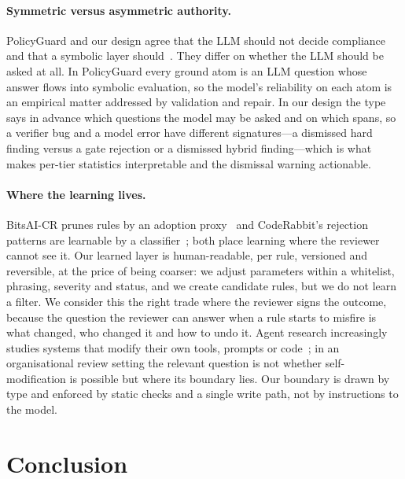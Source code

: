 \documentclass{IOS-Book-Article}
\begin{document}
\paragraph{Symmetric versus asymmetric authority.}
PolicyGuard and our design agree that the LLM should not decide compliance and that a symbolic layer should~\cite{malik2026}. They differ on whether the LLM should be asked at all. In PolicyGuard every ground atom is an LLM question whose answer flows into symbolic evaluation, so the model's reliability on each atom is an empirical matter addressed by validation and repair. In our design the type says in advance which questions the model may be asked and on which spans, so a verifier bug and a model error have different signatures---a dismissed hard finding versus a gate rejection or a dismissed hybrid finding---which is what makes per-tier statistics interpretable and the dismissal warning actionable.

\paragraph{Where the learning lives.}
BitsAI-CR prunes rules by an adoption proxy~\cite{sun2025} and CodeRabbit's rejection patterns are learnable by a classifier~\cite{lin2026}; both place learning where the reviewer cannot see it. Our learned layer is human-readable, per rule, versioned and reversible, at the price of being coarser: we adjust parameters within a whitelist, phrasing, severity and status, and we create candidate rules, but we do not learn a filter. We consider this the right trade where the reviewer signs the outcome, because the question the reviewer can answer when a rule starts to misfire is what changed, who changed it and how to undo it. Agent research increasingly studies systems that modify their own tools, prompts or code~\cite{madaan2023,shinn2023,zhang2025dgm}; in an organisational review setting the relevant question is not whether self-modification is possible but where its boundary lies. Our boundary is drawn by type and enforced by static checks and a single write path, not by instructions to the model.

\section{Conclusion}
\end{document}
